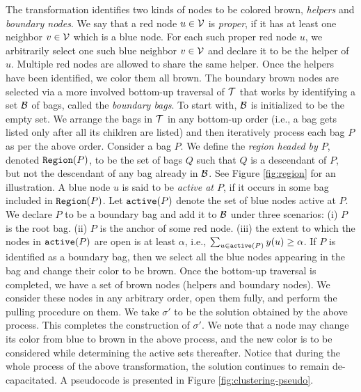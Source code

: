 \documentclass[11pt]{article}
\newcommand{\myactive} {{\tt active}}
\newcommand{\calV} {{\cal V}}
\newcommand{\myreg} {{\tt Region}}
\newcommand{\calT} {{\cal T}}
\newcommand{\calB} {{\cal B}}
\begin{document}
The transformation identifies two kinds of nodes to be colored brown, {\em helpers} and {\em boundary nodes}.
We say that a red node $u\in \calV$ is {\em proper}, if it has at least one neighbor $v\in \calV$ which is a blue node.
For each such proper red node $u$, we arbitrarily select one such blue neighbor $v\in \calV$ and declare it to be the helper of $u$.
Multiple red nodes are allowed to share the same helper.
Once the helpers have been identified, we color them all brown.
The boundary brown nodes are selected via a more involved bottom-up traversal of $\calT$
that works by identifying a set $\calB$ of bags, called the {\em boundary bags}.
To start with, $\calB$ is initialized to be the empty set.
We arrange the bags in $\calT$ in any bottom-up order (i.e., a bag gets listed only after all its children are listed)
and then iteratively process each bag $P$ as per the above order.  
Consider a bag $P$. We define the {\em region headed by $P$}, denoted $\myreg(P)$, to be the set of bags $Q$ such that
$Q$ is a descendant of $P$, but not the descendant of any bag already in $\calB$.
See Figure \ref{fig:region} for an illustration. 
A blue node $u$ is said to be {\em active at $P$}, if it occurs in some bag included in $\myreg(P)$.
Let $\myactive(P)$ denote the set of blue nodes active at $P$.
We declare $P$ to be a boundary bag and add it to $\calB$ under three scenarios:
(i) $P$ is the root bag.
(ii) $P$ is the anchor of some red node.
(iii) the extent to which the nodes in $\myactive(P)$ 
are open is at least $\alpha$, i.e., $\sum_{u\in \myactive(P)} y(u) \geq \alpha$.
If $P$ is identified as a boundary bag, then we select all the blue nodes appearing in the bag and change their color to be brown.
Once the bottom-up traversal is completed, we have a set of brown nodes (helpers and boundary nodes).
We consider these nodes in any arbitrary order, open them fully, and perform the pulling procedure on them. 
We take $\sigma'$ to be the solution obtained by the above process.  This completes the construction of $\sigma'$. 
We note that a node may change its color from blue to brown in the above process, and the new color is to be considered
while determining the active sets thereafter. Notice that during the whole process of the above transformation, the solution continues to remain de-capacitated. 
A pseudocode is presented in Figure \ref{fig:clustering-pseudo}. 
\end{document}
